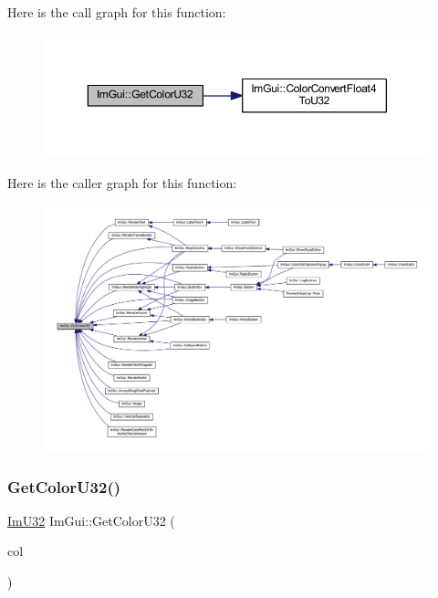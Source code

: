 Here is the call graph for this function\+:
\nopagebreak
\begin{figure}[H]
\begin{center}
\leavevmode
\includegraphics[width=350pt]{namespace_im_gui_a0de2d9bd347d9866511eb8d014e62556_cgraph}
\end{center}
\end{figure}
Here is the caller graph for this function\+:
\nopagebreak
\begin{figure}[H]
\begin{center}
\leavevmode
\includegraphics[width=350pt]{namespace_im_gui_a0de2d9bd347d9866511eb8d014e62556_icgraph}
\end{center}
\end{figure}
\mbox{\label{namespace_im_gui_ac701752365ddd58cecc1956fc62921a8}} 
\subsubsection{\texorpdfstring{Get\+Color\+U32()}{GetColorU32()}\hspace{0.1cm}{\footnotesize\ttfamily [2/3]}}
{\footnotesize\ttfamily \mbox{\hyperlink{imgui_8h_a118cff4eeb8d00e7d07ce3d6460eed36}{Im\+U32}} Im\+Gui\+::\+Get\+Color\+U32 (\begin{DoxyParamCaption}\item[{const \mbox{\hyperlink{struct_im_vec4}{Im\+Vec4}} \&}]{col }\end{DoxyParamCaption})}

